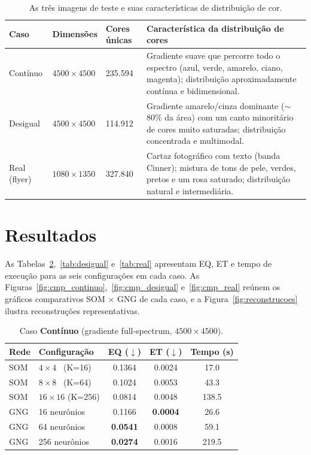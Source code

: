 \documentclass[11pt,a4paper]{article}
\begin{document}
\begin{table}[h]
\centering
\small
\caption{As três imagens de teste e suas características de distribuição de cor.}
\label{tab:casos}
\begin{tabularx}{\textwidth}{lllX}
\toprule
\textbf{Caso} & \textbf{Dimensões} & \textbf{Cores únicas} & \textbf{Característica da distribuição de cores} \\
\midrule
Contínuo & $4500\times4500$ & 235.594 & Gradiente suave que percorre todo o espectro (azul, verde, amarelo, ciano, magenta); distribuição aproximadamente contínua e bidimensional. \\
Desigual & $4500\times4500$ & 114.912 & Gradiente amarelo/cinza dominante ($\sim$80\% da área) com um canto minoritário de cores muito saturadas; distribuição concentrada e multimodal. \\
Real (flyer) & $1080\times1350$ & 327.840 & Cartaz fotográfico com texto (banda Cinner); mistura de tons de pele, verdes, pretos e um rosa saturado; distribuição natural e intermediária. \\
\bottomrule
\end{tabularx}
\end{table}

\section{Resultados}

As Tabelas~\ref{tab:continuo},~\ref{tab:desigual} e~\ref{tab:real} apresentam EQ, ET e tempo de execução para as seis configurações em cada caso. As Figuras~\ref{fig:cmp_continuo},~\ref{fig:cmp_desigual} e~\ref{fig:cmp_real} reúnem os gráficos comparativos SOM $\times$ GNG de cada caso, e a Figura~\ref{fig:reconstrucoes} ilustra reconstruções representativas.

\begin{table}[h]
\centering
\small
\caption{Caso \textbf{Contínuo} (gradiente full-spectrum, $4500\times4500$).}
\label{tab:continuo}
\begin{tabularx}{\textwidth}{llccc}
\toprule
\textbf{Rede} & \textbf{Configuração} & \textbf{EQ} ($\downarrow$) & \textbf{ET} ($\downarrow$) & \textbf{Tempo (s)} \\
\midrule
SOM & $4\times4$ \ (K=16)    & 0.1364 & 0.0024 & 17.0 \\
SOM & $8\times8$ \ (K=64)    & 0.1024 & 0.0053 & 43.3 \\
SOM & $16\times16$ (K=256)   & 0.0814 & 0.0048 & 138.5 \\
GNG & 16 neurônios           & 0.1166 & \textbf{0.0004} & 26.6 \\
GNG & 64 neurônios           & \textbf{0.0541} & 0.0008 & 59.1 \\
GNG & 256 neurônios          & \textbf{0.0274} & 0.0016 & 219.5 \\
\bottomrule
\end{tabularx}
\end{table}
\end{document}
